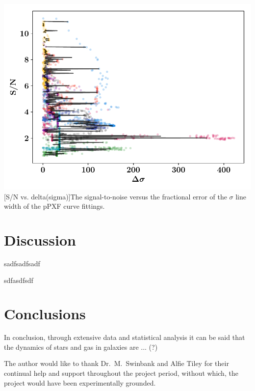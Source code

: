 \documentclass[12pt, twocolumn]{revtex4}    %
\begin{document}
\begin{center}
\includegraphics[width=1.0\linewidth]{data/reprocessed_sn_vs_delta_sigma}
[S/N vs. delta(sigma)]{The signal-to-noise versus the fractional error of the $\sigma$ line width of the pPXF curve fittings.}
\label{fig:oiiluminosity_redshift}
\end{center}

\section{Discussion} 
\label{sec:discussion}

sadfsadfsadf

sdfasdfsdf

\section{Conclusions}
 
In conclusion, through extensive data and statistical analysis it can be said that the dynamics of stars and gas in galaxies are ... (?) 

\begin{acknowledgments}
The author would like to thank Dr.~M.~Swinbank and Alfie Tiley for their continual help and support throughout the project period, without which, the project would have been experimentally grounded.
\end{acknowledgments}



\end{document}

